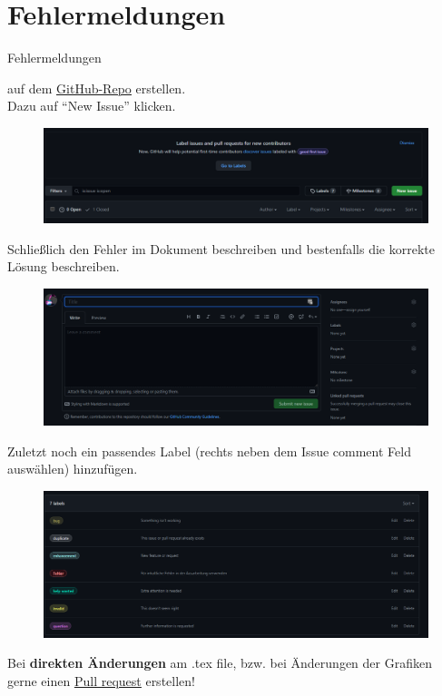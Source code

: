 \documentclass[a4paper, 11pt, ngerman, parskip=half-]{scrartcl}
\begin{document}
\section{Fehlermeldungen}
\label{sec:Fehler}
\hypertarget{Fehler}{Fehlermeldungen} auf dem \href{https://github.com/etschgi1/Ex2_Fragen/issues}{\underline{GitHub-Repo}} erstellen.\\
Dazu auf \enquote{New Issue} klicken.
\begin{figure}[H]
    \centering
    \includegraphics[width=15cm]{image/Misc/Issues.png}
\end{figure}
Schließlich den Fehler im Dokument beschreiben und bestenfalls die korrekte Lösung beschreiben.
\begin{figure}[H]
    \centering
    \includegraphics[width=15cm]{image/Misc/Issue_erstellen.png}
\end{figure}
Zuletzt noch ein passendes Label (rechts neben dem Issue comment Feld auswählen) hinzufügen.
\begin{figure}[H]
    \centering
    \includegraphics[width=15cm]{image/Misc/Labels.png}
\end{figure}
\vspace{5mm}
Bei \textbf{direkten Änderungen} am .tex file, bzw. bei Änderungen der Grafiken gerne einen \href{https://github.com/etschgi1/Ex2_Fragen/pulls}{\underline{Pull request}} erstellen!\\
\end{document}
